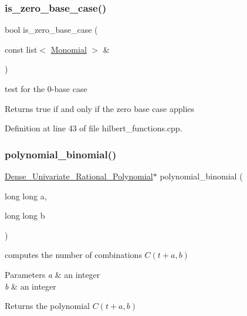 \subsubsection{\texorpdfstring{is\+\_\+zero\+\_\+base\+\_\+case()}{is\_zero\_base\_case()}}
{\footnotesize\ttfamily bool is\+\_\+zero\+\_\+base\+\_\+case (\begin{DoxyParamCaption}\item[{const list$<$ \hyperlink{group__polygroup_class_monomial}{Monomial} $>$ \&}]{ }\end{DoxyParamCaption})}



test for the 0-\/base case \cite{Bigatti97} 

\begin{DoxyReturn}{Returns}
{\ttfamily true} if and only if the zero base case applies 
\end{DoxyReturn}


Definition at line 43 of file hilbert\+\_\+functions.\+cpp.

\mbox{\label{group__commalg_ga185ac534295dffe04f9af3e235e1d44a}} 
\subsubsection{\texorpdfstring{polynomial\+\_\+binomial()}{polynomial\_binomial()}}
{\footnotesize\ttfamily \hyperlink{group__polygroup_class_dense___univariate___rational___polynomial}{Dense\+\_\+\+Univariate\+\_\+\+Rational\+\_\+\+Polynomial}$\ast$ polynomial\+\_\+binomial (\begin{DoxyParamCaption}\item[{long long}]{a,  }\item[{long long}]{b }\end{DoxyParamCaption})}



computes the number of combinations $C(t+a,b)$ 


\begin{DoxyParams}{Parameters}
{\em a} & an integer \\
\hline
{\em b} & an integer \\
\hline
\end{DoxyParams}
\begin{DoxyReturn}{Returns}
the polynomial $C(t+a,b)$ 
\end{DoxyReturn}
\mbox{\label{group__commalg_ga806777263a7836e3dabc0349440c47db}} 
